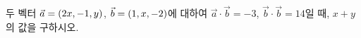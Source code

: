 두 벡터 $\vec{a}=(2x{,}\mkern3mu\mathopen{}-1{,}\mkern3mu\mathopen{}y)$, $\vec{b}=(1{,}\mkern3mu\mathopen{}x{,}\mkern3mu\mathopen{}-2)$에 대하여 $\vec{a}\cdot\vec{b}=-3$, $\vec{b}\cdot\vec{b}=14$일 때, $x+y$의 값을 구하시오. 
